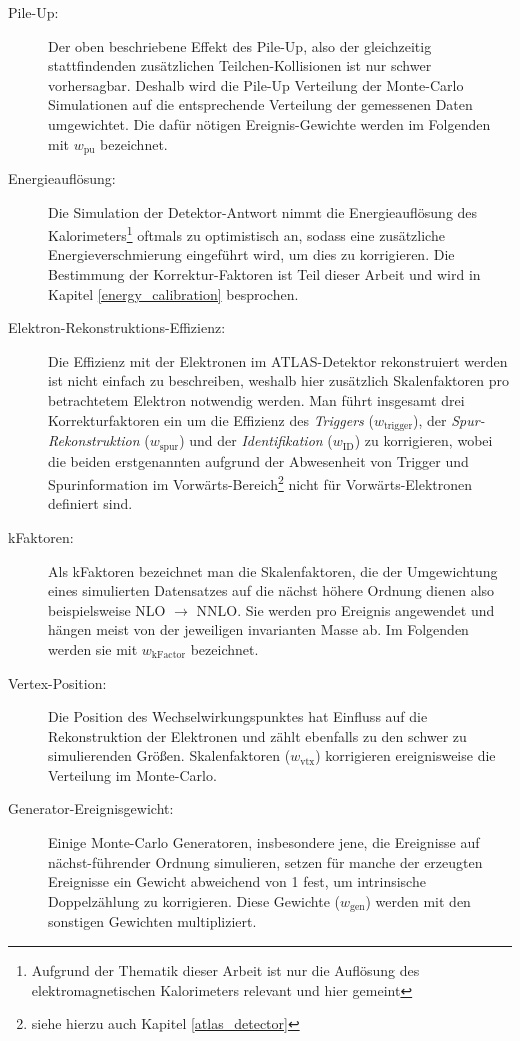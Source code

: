 \begin{description}
    \item[Pile-Up:] Der oben beschriebene Effekt des Pile-Up, also der
        gleichzeitig stattfindenden zusätzlichen Teilchen-Kollisionen ist nur
        schwer vorhersagbar. Deshalb wird die Pile-Up Verteilung der
        Monte-Carlo Simulationen auf die entsprechende Verteilung der
        gemessenen Daten umgewichtet. Die dafür nötigen Ereignis-Gewichte
        werden im Folgenden mit $w_\text{pu}$ bezeichnet.
    \item[Energieauflösung:] Die Simulation der Detektor-Antwort nimmt die
        Energieauflösung des Kalorimeters\footnote{Aufgrund der Thematik dieser
        Arbeit ist nur die Auflösung des elektromagnetischen Kalorimeters
        relevant und hier gemeint} oftmals zu optimistisch an, sodass eine
        zusätzliche Energieverschmierung eingeführt wird, um dies zu
        korrigieren. Die Bestimmung der Korrektur-Faktoren ist Teil dieser
        Arbeit und wird in Kapitel \ref{energy_calibration} besprochen.
    \item[Elektron-Rekonstruktions-Effizienz:] Die Effizienz mit der Elektronen
        im \linebreak ATLAS-Detektor rekonstruiert werden ist nicht einfach zu
        beschreiben, weshalb hier zusätzlich Skalenfaktoren pro betrachtetem
        Elektron notwendig werden. Man führt insgesamt drei Korrekturfaktoren
        ein um die Effizienz des \textit{Triggers} ($w_\text{trigger}$), der 
        \textit{Spur-Rekonstruktion} ($w_\text{spur}$) und der
        \textit{Identifikation} ($w_\text{ID}$) zu korrigieren, wobei die
        beiden erstgenannten aufgrund der Abwesenheit von Trigger und
        Spurinformation im Vorwärts-Bereich\footnote{siehe hierzu auch Kapitel
        \ref{atlas_detector}} nicht für Vorwärts-Elektronen definiert sind.
    \item[kFaktoren:] Als kFaktoren bezeichnet man die Skalenfaktoren, die der
        Umgewichtung eines simulierten Datensatzes auf die nächst höhere
        Ordnung dienen also beispielsweise NLO $\rightarrow$ NNLO. Sie werden
        pro Ereignis angewendet und hängen meist von der jeweiligen
        invarianten Masse ab. Im Folgenden werden sie mit $w_\text{kFactor}$
        bezeichnet.
    \item[Vertex-Position:] Die Position des Wechselwirkungspunktes hat
        Einfluss auf die Rekonstruktion der Elektronen und zählt ebenfalls zu
        den schwer zu simulierenden Größen. Skalenfaktoren ($w_\text{vtx}$)
        korrigieren ereignisweise die Verteilung im Monte-Carlo.
    \item[Generator-Ereignisgewicht:] Einige Monte-Carlo Generatoren,
        insbesondere jene, die Ereignisse auf nächst-führender Ordnung
        simulieren, setzen für manche der erzeugten Ereignisse ein Gewicht
        abweichend von 1 fest, um intrinsische Doppelzählung zu korrigieren.
        Diese Gewichte ($w_\text{gen}$) werden mit den sonstigen Gewichten
        multipliziert.
\end{description}

